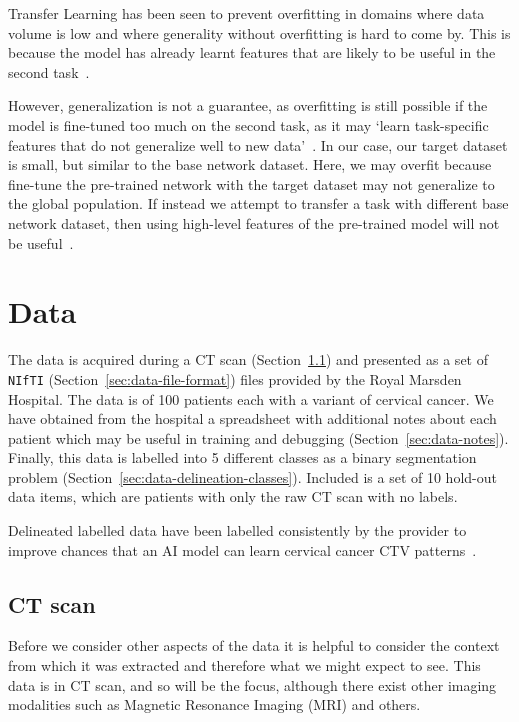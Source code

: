 \documentclass[11pt,twoside]{report}
\begin{document}
Transfer Learning has been seen to prevent overfitting in domains where data volume is low and where generality without overfitting is hard to come by. This is because the model has already learnt features that are likely to be useful in the second task~\cite{geeks-transfer-learning}. 

However, generalization is not a guarantee, as overfitting is still possible if the model is fine-tuned too much on the second task, as it may `learn task-specific features that do not generalize well to new data'~\cite{geeks-transfer-learning}. In our case, our target dataset is small, but similar to the base network dataset. Here, we may overfit because fine-tune the pre-trained network with the target dataset may not generalize to the global population. If instead we attempt to transfer a task with different base network dataset, then using high-level features of the pre-trained model will not be useful~\cite{geeks-transfer-learning}.


\chapter{Data}\label{sect:data}

The data is acquired during a CT scan (Section~\ref{sec:data-ct-scan}) and presented as a set of \texttt{NIfTI} (Section~\ref{sec:data-file-format}) files provided by the Royal Marsden Hospital. The data is of 100 patients each with a variant of cervical cancer. We have obtained from the hospital a spreadsheet with additional notes about each patient which may be useful in training and debugging (Section~\ref{sec:data-notes}). Finally, this data is labelled into 5 different classes as a binary segmentation problem (Section~\ref{sec:data-delineation-classes}). Included is a set of 10 hold-out data items, which are patients with only the raw CT scan with no labels.

Delineated labelled data have been labelled consistently by the provider to improve chances that an AI model can learn cervical cancer CTV patterns~\cite{AMLART-data}.

\section{CT scan}\label{sec:data-ct-scan}

Before we consider other aspects of the data it is helpful to consider the context from which it was extracted and therefore what we might expect to see. This data is in CT scan, and so will be the focus, although there exist other imaging modalities such as Magnetic Resonance Imaging (MRI) and others.
\end{document}

